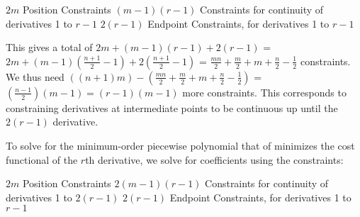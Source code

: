 \documentclass[11pt]{article}
\begin{document}
\mbox{} \newline
$2m$ Position Constraints \newline
$(m-1)(r-1)$ Constraints for continuity of derivatives 1 to $r-1$ \newline
$2(r-1)$ Endpoint Constraints, for derivatives 1 to $r-1$ \newline

This gives a total of $2m+(m-1)(r-1)+2(r-1)$ = $2m+(m-1)(\frac{n+1}{2}-1) + 2(\frac{n+1}{2}-1)$ = $\frac{mn}{2}+\frac{m}{2}+m+\frac{n}{2}-\frac{1}{2}$ constraints. We thus need $\left( (n+1)m \right) - \left( \frac{mn}{2}+\frac{m}{2}+m+\frac{n}{2}-\frac{1}{2} \right)$ = $(\frac{n-1}{2})(m-1) = (r-1)(m-1)$ more constraints. This corresponds to constraining derivatives at intermediate points to be continuous up until the $2(r-1)$ derivative. 

\mbox{} \newline
To solve for the minimum-order piecewise polynomial that of minimizes the cost functional of the $r$th derivative, we solve for coefficients using the constraints:

\mbox{} \newline
$2m$ Position Constraints \newline
$2(m-1)(r-1)$ Constraints for continuity of derivatives 1 to $2(r-1)$ \newline
$2(r-1)$ Endpoint Constraints, for derivatives 1 to $r-1$ \newline
\end{document}
